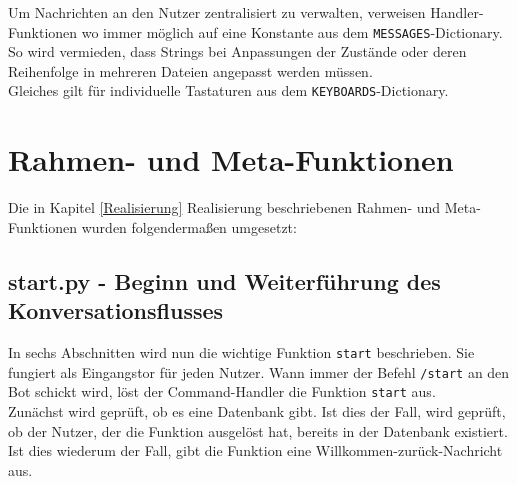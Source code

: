             Um Nachrichten an den Nutzer zentralisiert zu verwalten, verweisen Handler-Funktionen wo immer möglich auf eine Konstante aus dem \verb|MESSAGES|-Dictionary. So wird vermieden, dass Strings bei Anpassungen der Zustände oder deren Reihenfolge in mehreren Dateien angepasst werden müssen.\\
        
            Gleiches gilt für individuelle Tastaturen aus dem \verb|KEYBOARDS|-Dictionary. 











    \section{Rahmen- und Meta-Funktionen}
        Die in Kapitel \ref*{Realisierung} Realisierung beschriebenen Rahmen- und Meta-Funktionen wurden folgendermaßen umgesetzt:

        \subsection{start.py - Beginn und Weiterführung des Konversationsflusses} \label{Implementierung: start.py}
        In sechs Abschnitten wird nun die wichtige Funktion \verb|start| beschrieben. Sie fungiert als Eingangstor für jeden Nutzer. Wann immer der Befehl \verb|/start| an den Bot schickt wird, löst der Command-Handler die Funktion \verb|start| aus.\\
        Zunächst wird geprüft, ob es eine Datenbank gibt. Ist dies der Fall, wird geprüft, ob der Nutzer, der die Funktion ausgelöst hat, bereits in der Datenbank existiert. Ist dies wiederum der Fall, gibt die Funktion eine Willkommen-zurück-Nachricht aus.

